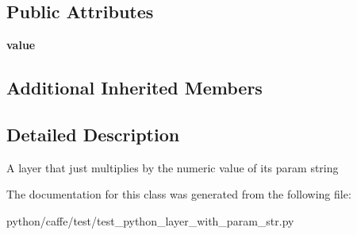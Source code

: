 \subsection*{Public Attributes}
\begin{DoxyCompactItemize}
\item 
\mbox{\label{classtest__python__layer__with__param__str_1_1_simple_param_layer_a1235ca13a9f55dcb8679796b5eaab0b9}} 
{\bfseries value}
\end{DoxyCompactItemize}
\subsection*{Additional Inherited Members}


\subsection{Detailed Description}
\begin{DoxyVerb}A layer that just multiplies by the numeric value of its param string\end{DoxyVerb}
 

The documentation for this class was generated from the following file\+:\begin{DoxyCompactItemize}
\item 
python/caffe/test/test\+\_\+python\+\_\+layer\+\_\+with\+\_\+param\+\_\+str.\+py\end{DoxyCompactItemize}
